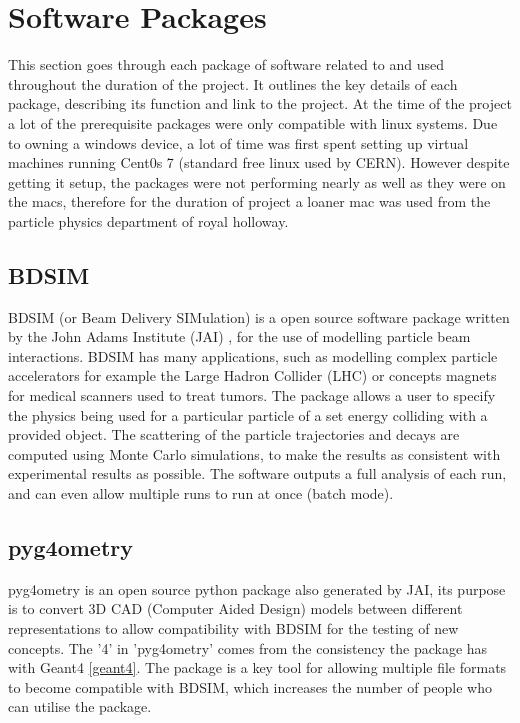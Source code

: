 \documentclass[12pt,a4paper]{article}
\begin{document}

\section{Software Packages}
\label{packs}
This section goes through each package of software related to and used throughout the duration of the project. It outlines the key details of each package, describing its function and link to the project. At the time of the project a lot of the prerequisite packages were only compatible with linux systems. Due to owning a windows device, a lot of time was first spent setting up virtual machines running Cent0s 7 (standard free linux used by CERN). However despite getting it setup, the packages were not performing nearly as well as they were on the macs, therefore for the duration of project a loaner mac was used from the particle physics department of royal holloway. 

\subsection{BDSIM}
\label{bdsim}
BDSIM (or Beam Delivery SIMulation) is a open source software package written by the John Adams Institute (JAI) \cite{jai}, for the use of modelling particle beam interactions. BDSIM has many applications, such as modelling complex particle accelerators for example the Large Hadron Collider (LHC) or concepts magnets for medical scanners used to treat tumors. The package allows a user to specify the physics being used for a particular particle of a set energy colliding with a provided object. The scattering of the particle trajectories and decays are computed using Monte Carlo simulations, to make the results as consistent with experimental results as possible. The software outputs a full analysis of each run, and can even allow multiple runs to run at once (batch mode).

\subsection{pyg4ometry}
\label{pyg}
pyg4ometry is an open source python package also generated by JAI, its purpose is to convert 3D CAD (Computer Aided Design) models between different representations to allow compatibility with BDSIM for the testing of new concepts. The '4' in 'pyg4ometry' comes from the consistency the package has with Geant4 \ref{geant4}. The package is a key tool for allowing multiple file formats to become compatible with BDSIM, which increases the number of people who can utilise the package.
\end{document}
